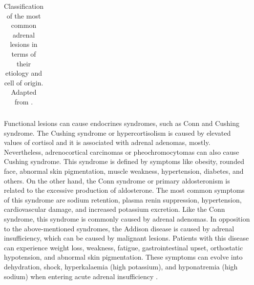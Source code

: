 \documentclass{article}
\begin{document}
\begin{table}[]
\begin{tabular}{cccc}
        \\\bottomrule
    \end{tabular}
    \caption{Classification of the most common adrenal lesions in terms of their
        etiology and cell of origin.  Adapted from \cite{Panda2015}.}
    \label{tab:data_A}
\end{table}

Functional lesions can cause endocrines syndromes, such as Conn and Cushing
syndrome. The Cushing syndrome or hypercortisolism is caused by elevated values
of cortisol and it is associated with adrenal adenomas, mostly. Nevertheless,
adrenocortical carcinomas or pheochromocytomas can also cause Cushing syndrome.
This syndrome is defined by symptoms like obesity, rounded face, abnormal skin
pigmentation, muscle weakness, hypertension, diabetes, and others. On the other
hand, the Conn syndrome or primary aldosteronism is related to the excessive
production of aldosterone. The most common symptoms of this syndrome are sodium
retention, plasma renin suppression, hypertension, cardiovascular damage, and
increased potassium excretion. Like the Conn syndrome, this syndrome is commonly
caused by adrenal adenomas. In opposition to the above-mentioned syndromes, the
Addison disease is caused by adrenal insufficiency, which can be caused by
malignant lesions. Patients with this disease can experience weight loss,
weakness, fatigue, gastrointestinal upset, orthostatic hypotension, and abnormal
skin pigmentation. These symptoms can evolve into dehydration, shock,
hyperkalaemia (high potassium), and hyponatremia (high sodium) when entering
acute adrenal insufficiency \cite{Wang2018}.
\end{document}
